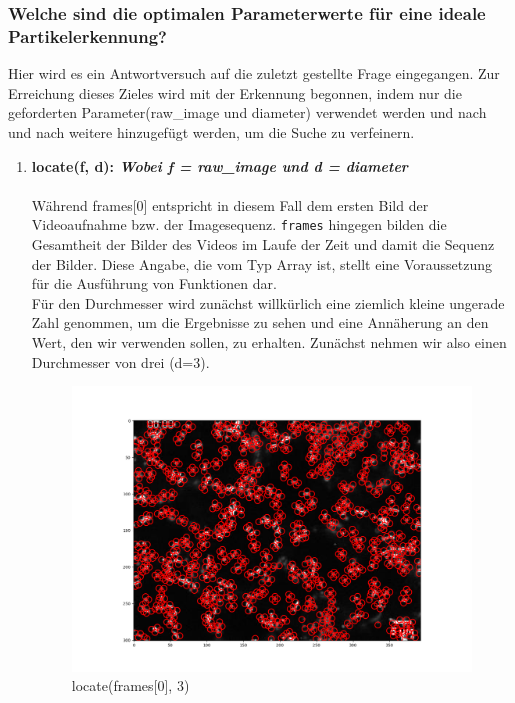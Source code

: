 	\subsubsection{Welche sind die optimalen Parameterwerte für eine ideale Partikelerkennung? \label{kap3_OP}}
	Hier wird es ein Antwortversuch auf die zuletzt gestellte Frage eingegangen. Zur Erreichung dieses Zieles wird mit der Erkennung begonnen, indem nur die geforderten Parameter(raw\_image und diameter) verwendet werden und nach und nach weitere hinzugefügt werden, um die Suche zu verfeinern. 
	
	\begin{enumerate}
    			\item \textbf{locate(f, d): \textit{Wobei f = raw\_image und d = diameter}} \\ \\
    			 Während frames[0] entspricht in diesem Fall dem ersten Bild der Videoaufnahme bzw. der Imagesequenz. \texttt{frames} hingegen bilden die Gesamtheit der Bilder des Videos im Laufe der Zeit und damit die Sequenz der Bilder.  Diese Angabe, die vom Typ Array ist, stellt eine Voraussetzung für die Ausführung von Funktionen dar. \\
    			 Für den Durchmesser wird zunächst willkürlich eine ziemlich kleine ungerade Zahl genommen, um die Ergebnisse zu sehen und eine Annäherung an den Wert, den wir verwenden sollen, zu erhalten. Zunächst nehmen wir also einen Durchmesser von drei (d=3).  
    			 
\begin{figure}[H]
    \centering
    \includegraphics[scale=0.35]{Grafiken/trackpyBilder/locate(f0, diameter=3).png}
    \caption{locate(frames[0], 3)}
    \label{fig:bild_label}
\end{figure} 


\end{enumerate}
